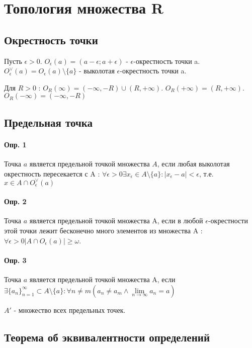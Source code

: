 \documentclass[10pt]{article}
\newcommand{\limninf}{\lim\limits_{n \to \infty}}
\newcommand{\seq}[2]{ \{#1_{#2}\}_{#2=1}^\infty}
\newcommand{\seqn}[1]{\seq{#1}{n}}
\begin{document}
	\section{Топология множества R}
		\subsection{Окрестность точки}
			Пусть $\epsilon > 0$. $O_\epsilon(a) = (a - \epsilon; a + \epsilon)$ - $\epsilon$-окрестность точки a. \\
			$O_\epsilon^\vee(a) = O_\epsilon(a) \setminus \{a\}$ - выколотая $\epsilon$-окрестность точки a.
			
			Для $R > 0$ : $O_R(\infty) = (-\infty, -R) \cup (R, +\infty)$. $O_R(+\infty) = (R, +\infty)$. $O_R(-\infty) = (-\infty, -R)$
		\subsection{Предельная точка}
			\paragraph{Опр. 1} \label{pred_t1} Точка $a$ является предельной точкой множества $A$, если любая выколотая окрестность пересекается с A : $ \forall \epsilon > 0 \exists x_\epsilon \in A\setminus\{a\} : |x_\epsilon - a| < \epsilon $, т.е. $x \in A \cap O_\epsilon^\vee(a)$
			
			\paragraph{Опр. 2}  \label{pred_t2} Точка $a$ является предельной точкой множества A, если в любой $\epsilon$-окрестности этой точки лежит бесконечно много элементов из множества A : $\forall \epsilon > 0 |A \cap O_\epsilon(a)| \geq \omega$.
			
			\paragraph{Опр. 3} \label{pred_t3} Точка $a$ является предельной точкой множества A, если \\$\exists \seqn{a} \subset A \setminus \{a\} : \forall n \neq m (a_n \neq a_m \wedge \limninf a_n = a)$
			
			$A'$ - множество всех предельных точек.
		
		\subsection{Теорема об эквивалентности определений}
\end{document}
